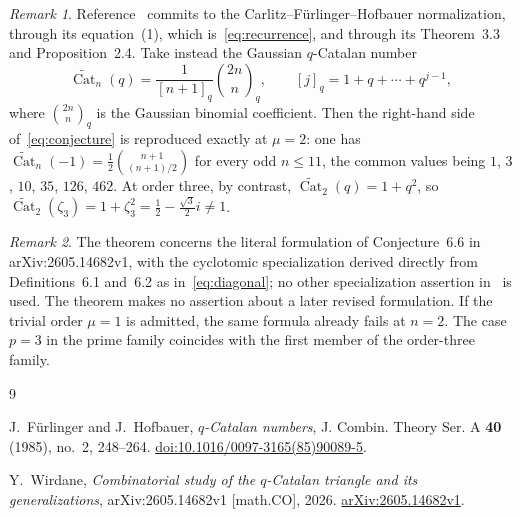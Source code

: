 \documentclass[11pt]{amsart}
\theoremstyle{remark}
\newtheorem*{remark}{Remark}
\newcommand{\Cat}{\operatorname{Cat}}
\begin{document}
\begin{remark}
Reference~\cite{Wirdane} commits to the
Carlitz--F\"urlinger--Hofbauer normalization, through its equation~(1),
which is~\eqref{eq:recurrence}, and through its Theorem~3.3 and
Proposition~2.4. Take instead the Gaussian $q$-Catalan number
\[
  \widetilde{\Cat}_n(q)=\frac{1}{[n+1]_q}\binom{2n}{n}_{\!q},
  \qquad [j]_q=1+q+\cdots+q^{j-1},
\]
where $\binom{2n}{n}_{\!q}$ is the Gaussian binomial coefficient. Then
the right-hand side of~\eqref{eq:conjecture} is reproduced exactly at
$\mu=2$: one has
$\widetilde{\Cat}_n(-1)=\frac12\binom{n+1}{(n+1)/2}$ for every odd
$n\le11$, the common values being $1$, $3$, $10$, $35$, $126$, $462$.
At order three, by contrast,
$\widetilde{\Cat}_2(q)=1+q^2$, so
$\widetilde{\Cat}_2(\zeta_3)=1+\zeta_3^2=\frac12-\frac{\sqrt3}{2}i
\ne1$.
\end{remark}

\begin{remark}
The theorem concerns the literal formulation of Conjecture~6.6 in
arXiv:2605.14682v1, with the cyclotomic specialization derived directly
from Definitions~6.1 and~6.2 as in~\eqref{eq:diagonal}; no other
specialization assertion in~\cite{Wirdane} is used. The theorem makes
no assertion about a later revised formulation. If the trivial order $\mu=1$ is
admitted, the same formula already fails at $n=2$. The case $p=3$ in
the prime family coincides with the first member of the order-three
family.
\end{remark}

\begin{thebibliography}{9}

J.~F\"urlinger and J.~Hofbauer,
\emph{$q$-Catalan numbers},
J. Combin. Theory Ser. A \textbf{40} (1985), no.~2, 248--264.
\href{https://doi.org/10.1016/0097-3165(85)90089-5}
{doi:10.1016/0097-3165(85)90089-5}.

Y.~Wirdane,
\emph{Combinatorial study of the $q$-Catalan triangle and its
generalizations},
arXiv:2605.14682v1 [math.CO], 2026.
\href{https://arxiv.org/abs/2605.14682v1}
{arXiv:2605.14682v1}.

\end{thebibliography}
\end{document}
